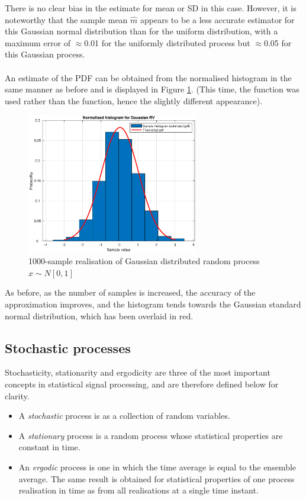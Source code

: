 \noindent
There is no clear bias in the estimate for mean or SD in this case. However, it is noteworthy that the sample mean $\hat{m}$ appears to be a less accurate estimator for this Gaussian normal distribution than for the uniform distribution, with a maximum error of $\approx$0.01 for the uniformly distributed process but $\approx$0.05 for this Gaussian process.
\\\\\noindent
An estimate of the PDF can be obtained from the normalised histogram in the same manner as before and is displayed in Figure \ref{fig:gausshist}. (This time, the  function was used rather than the  function, hence the slightly different appearance).

\begin{figure}[H]
    \centering
    \includegraphics[width=7.5cm]{assignment1figs/gausshist.eps}
    \caption{1000-sample realisation of Gaussian distributed random process $x \sim \textit{N}[0,1]$}
    \label{fig:gausshist}
\end{figure}

\noindent
As before, as the number of samples is increased, the accuracy of the approximation improves, and the histogram tends towards the Gaussian standard normal distribution, which has been overlaid in red.

\subsection{Stochastic processes}

Stochasticity, stationarity and ergodicity are three of the most important concepts in statistical signal processing, and are therefore defined below for clarity.

\begin{itemize}
\item A \textit{stochastic} process is as a collection of random variables.
\item A \textit{stationary} process is a random process whose statistical properties are constant in time.
\item An \textit{ergodic} process is one in which the time average is equal to the ensemble average. The same result is obtained for statistical properties of one process realisation in time as from all realisations at a single time instant.
\end{itemize}

